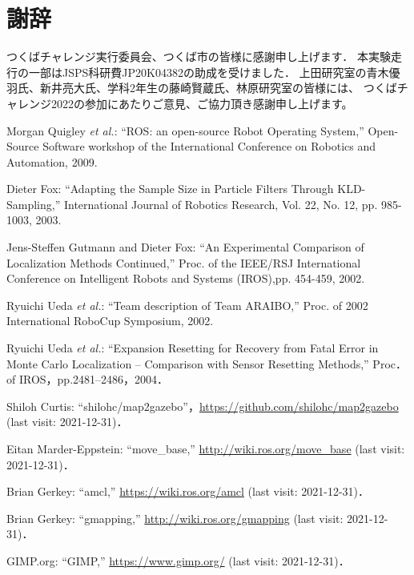 \documentclass[twocolumn,9pt]{jsproceedings}
\begin{document}
\section*{謝辞}

つくばチャレンジ実行委員会、つくば市の皆様に感謝申し上げます．
本実験走行の一部はJSPS科研費JP20K04382の助成を受けました．
上田研究室の青木優羽氏、新井亮大氏、学科2年生の藤崎賢蔵氏、林原研究室の皆様には、
つくばチャレンジ2022の参加にあたりご意見、ご協力頂き感謝申し上げます。


\footnotesize
\begin{thebibliography}{99}
	  Morgan Quigley {\it et al.}: ``ROS: an open-source Robot Operating System,'' 
Open-Source Software workshop of the International Conference on Robotics and Automation, 2009. 

Dieter Fox:
``Adapting the Sample Size in Particle Filters Through KLD-Sampling,''
International Journal of Robotics Research, Vol. 22, No. 12, pp. 985-1003, 2003. 

Jens-Steffen Gutmann and Dieter Fox: 
``An Experimental Comparison of Localization Methods Continued,''
Proc. of the IEEE/RSJ International Conference on Intelligent Robots and Systems (IROS),pp. 454-459, 2002.
  
	Ryuichi Ueda {\it et al.}: 
``Team description of Team ARAIBO,'' 
Proc. of 2002 International RoboCup Symposium, 2002. 

	Ryuichi Ueda {\it et al.}: 
  ``Expansion Resetting for Recovery from Fatal Error in Monte Carlo Localization -- Comparison with Sensor Resetting Methods,'' Proc．of IROS，pp.2481--2486，2004．
  
  Shiloh Curtis: ``shilohc/map2gazebo''，\url{https://github.com/shilohc/map2gazebo} (last visit: 2021-12-31)．
  
  Eitan Marder-Eppstein: ``move\_base,'' \url{http://wiki.ros.org/move_base} (last visit: 2021-12-31)．
  
  Brian Gerkey: ``amcl,'' \url{https://wiki.ros.org/amcl} (last visit: 2021-12-31)．

  Brian Gerkey: ``gmapping,'' \url{http://wiki.ros.org/gmapping} (last visit: 2021-12-31)．
  
  GIMP.org: ``GIMP,'' \url{https://www.gimp.org/} (last visit: 2021-12-31)．
  

\end{thebibliography}
\end{document}
